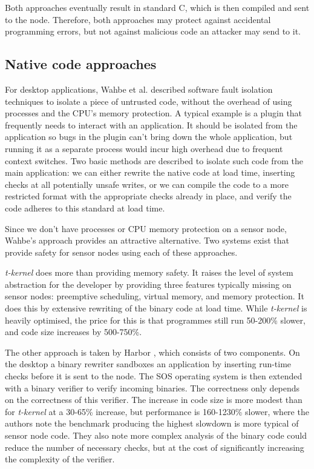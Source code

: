 Both approaches eventually result in standard C, which is then compiled and sent to the node. Therefore, both approaches may protect against accidental programming errors, but not against malicious code an attacker may send to it.

\subsection{Native code approaches}
For desktop applications, Wahbe et al. described software fault isolation \cite{Wahbe:1994cj} techniques to isolate a piece of untrusted code, without the overhead of using processes and the CPU's memory protection. A typical example is a plugin that frequently needs to interact with an application. It should be isolated from the application so bugs in the plugin can't bring down the whole application, but running it as a separate process would incur high overhead due to frequent context switches. Two basic methods are described to isolate such code from the main application: we can either rewrite the native code at load time, inserting checks at all potentially unsafe writes, or we can compile the code to a more restricted format with the appropriate checks already in place, and verify the code adheres to this standard at load time.

Since we don't have processes or CPU memory protection on a sensor node, Wahbe's approach provides an attractive alternative. Two systems exist that provide safety for sensor nodes using each of these approaches.

\emph{t-kernel} does more than providing memory safety. It raises the level of system abstraction for the developer by providing three features typically missing on sensor nodes: preemptive scheduling, virtual memory, and memory protection. It does this by extensive rewriting of the binary code at load time. While \emph{t-kernel} is heavily optimised, the price for this is that programmes still run 50-200\% slower, and code size increases by 500-750\%.

The other approach is taken by Harbor \cite{Kumar:2007ge}, which consists of two components. On the desktop a binary rewriter sandboxes an application by inserting run-time checks before it is sent to the node. The SOS operating system \cite{Han:2005th} is then extended with a binary verifier to verify incoming binaries. The correctness only depends on the correctness of this verifier. The increase in code size is more modest than for \emph{t-kernel} at a 30-65\% increase, but performance is 160-1230\% slower, where the authors note the benchmark producing the highest slowdown is more typical of sensor node code. They also note more complex analysis of the binary code could reduce the number of necessary checks, but at the cost of significantly increasing the complexity of the verifier.

